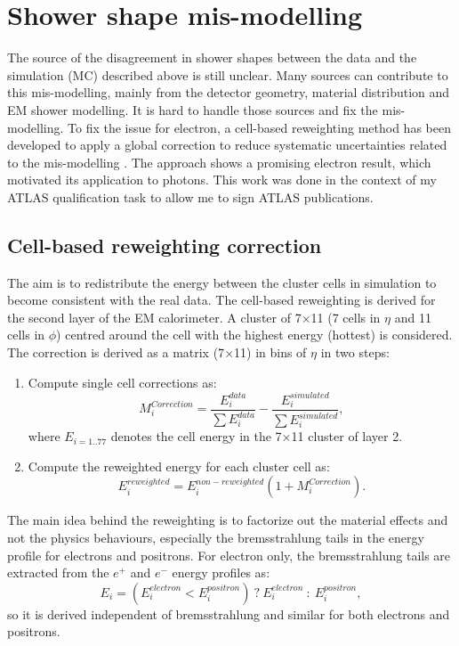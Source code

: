 \section{Shower shape mis-modelling}
\label{gamma:ss}
The source of the disagreement in shower shapes between the data and the simulation (MC) described above is still unclear. Many sources can contribute to this mis-modelling, mainly from the detector geometry, material distribution and EM shower modelling. It is hard to handle those sources and fix the mis-modelling. To fix the issue for electron, a cell-based reweighting method has been developed to apply a global correction to reduce systematic uncertainties related to the mis-modelling \cite{xu, khandoga}. The approach shows a promising electron result, which motivated its application to photons. This work was done in the context of my ATLAS qualification task to allow me to sign ATLAS publications.

\subsection{Cell-based reweighting correction}
\label{gamma:ss:reweighting}
The aim is to redistribute the energy between the cluster cells in simulation to become consistent with the real data. The cell-based reweighting is derived for the second layer of the EM calorimeter. A cluster of 7$\times$11 (7 cells in $\eta$ and 11 cells in $\phi$) centred around the cell with the highest energy (hottest) is considered. The correction is derived as a matrix (7$\times$11) in bins of $\eta$ in two steps:
\begin{enumerate}
    \item Compute single cell corrections as: 
    \begin{equation}
        M_{i}^{Correction} = \frac{E_{i}^{data}}{\sum E_{i}^{data}} -  \frac{E_{i}^{simulated}}{\sum E_{i}^{simulated}},
    \end{equation}
    where $E_{i = 1 .. 77}$ denotes the cell energy in the 7$\times$11 cluster of layer 2. 
    \item Compute the reweighted energy for each cluster cell as: 
    \begin{equation}
        E_{i}^{reweighted} = E_{i}^{non-reweighted}(1+M_{i}^{Correction}).
    \end{equation}
\end{enumerate}
The main idea behind the reweighting is to factorize out the material effects and not the physics behaviours, especially the bremsstrahlung tails in the energy profile for electrons and positrons. For electron only, the bremsstrahlung tails are extracted from the $e^+$ and $e^-$ energy profiles as: 
\begin{equation}
    E_{i} = (E_{i}^{electron} <  E_{i}^{positron}) \ ? \ E_{i}^{electron} \ : \  E_{i}^{positron},
\end{equation}
so it is derived independent of bremsstrahlung and similar for both electrons and positrons.


